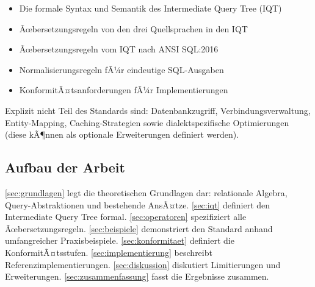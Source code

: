 \begin{itemize}[leftmargin=1.5cm]
  \item Die formale Syntax und Semantik des Intermediate Query Tree (IQT)
  \item Ãœbersetzungsregeln von den drei Quellsprachen in den IQT
  \item Ãœbersetzungsregeln vom IQT nach ANSI SQL:2016
  \item Normalisierungsregeln fÃ¼r eindeutige SQL-Ausgaben
  \item KonformitÃ¤tsanforderungen fÃ¼r Implementierungen
\end{itemize}

Explizit nicht Teil des Standards sind: Datenbankzugriff, Verbindungsverwaltung,
Entity-Mapping, Caching-Strategien sowie dialektspezifische Optimierungen
(diese kÃ¶nnen als optionale Erweiterungen definiert werden).

\subsection{Aufbau der Arbeit}
\label{subsec:aufbau}

\ref{sec:grundlagen} legt die theoretischen Grundlagen dar:
relationale Algebra, Query-Abstraktionen und bestehende AnsÃ¤tze.
\ref{sec:iqt} definiert den Intermediate Query Tree formal.
\ref{sec:operatoren} spezifiziert alle Ãœbersetzungsregeln.
\ref{sec:beispiele} demonstriert den Standard anhand umfangreicher
Praxisbeispiele.
\ref{sec:konformitaet} definiert die KonformitÃ¤tsstufen.
\ref{sec:implementierung} beschreibt Referenzimplementierungen.
\ref{sec:diskussion} diskutiert Limitierungen und Erweiterungen.
\ref{sec:zusammenfassung} fasst die Ergebnisse zusammen.

